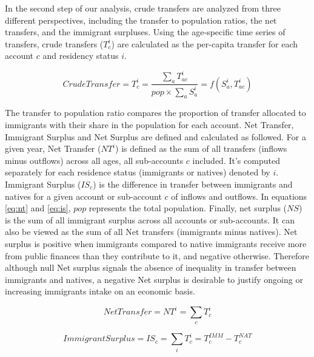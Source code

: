 \vspace{0.7em}\par
In the second step of our analysis, crude transfers are analyzed from three different perspectives, including the transfer to population ratios, the net transfers, and the immigrant surpluses.
Using the age-specific time series of transfers, crude transfers (\(T^{i}_c \)) are calculated as the per-capita transfer for each account \(c \) and residency status \(i\).

\begin{equation}\label{eq:pc}
  Crude Transfer=T^{i}_c= \frac{\displaystyle\sum_{a}T^{i}_{ac} }{ pop \times \displaystyle\sum_{a} S^{i}_a}=f(S^{i}_a, T^{i}_{ac})
\end{equation}

The transfer to population ratio compares the proportion of transfer allocated to immigrants with their share in the population for each account.
Net Transfer, Immigrant Surplus and Net Surplus are defined and calculated as followed.
For a given year, Net Transfer (\(NT^{i}\)) is defined as the sum of all transfers (inflows minus outflows) across all ages, all sub-accounts \(c \) included.
It's computed separately for each residence status (immigrants or natives) denoted by \(i \).
Immigrant Surplus (\(IS_{c}\)) is the difference in transfer between immigrants and natives for a given account or sub-account \(c \) of inflows and outflows.
In equations \eqref{eq:nt} and \eqref{eq:is}, \( pop \) represents the total population.
Finally, net surplus (\( NS \)) is the sum of all immigrant surplus across all accounts or sub-accounts.
It can also be viewed as the sum of all Net transfers (immigrants minus natives).
Net surplus is positive when immigrants compared to native immigrants receive more from public finances than they contribute to it, and negative otherwise.
Therefore although null Net surplus signals the absence of inequality in transfer between immigrants and natives, a negative Net surplus is desirable to justify ongoing or increasing immigrants intake on an economic basis.

\begin{equation}\label{eq:nt}
  Net Transfer=NT^{i}= \displaystyle\sum_{c}T^{i}_{c}
\end{equation}

\begin{equation}\label{eq:is}
  Immigrant Surplus=IS_{c}= \displaystyle\sum_{i}T^{i}_{c}=T^{IMM}_{c}-T^{NAT}_{c}
\end{equation}

